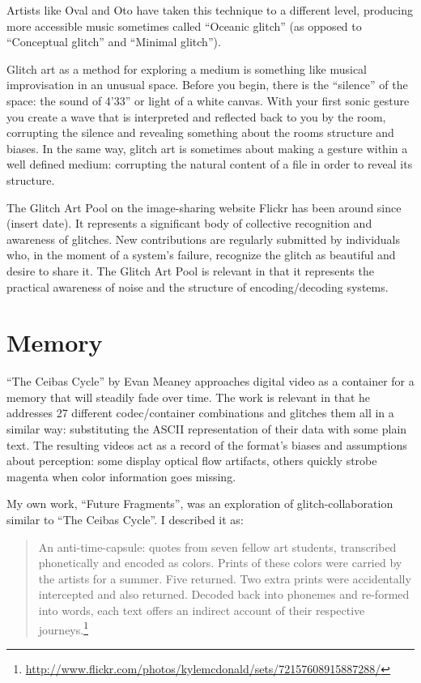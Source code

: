 \documentclass{thesis}
\begin{document}
	Artists like Oval and Oto have taken this technique to a different level, producing more accessible music sometimes called ``Oceanic glitch'' (as opposed to ``Conceptual glitch'' and ``Minimal glitch'').\cite{Sangild04}
	
	Glitch art as a method for exploring a medium is something like musical improvisation in an unusual space. Before you begin, there is the ``silence'' of the space: the sound of 4'33'' or light of a white canvas. With your first sonic gesture you create a wave that is interpreted and reflected back to you by the room, corrupting the silence and revealing something about the rooms structure and biases. In the same way, glitch art is sometimes about making a gesture within a well defined medium: corrupting the natural content of a file in order to reveal its structure.
	
	The Glitch Art Pool\cite{liminalmike_flickr:glitch_????} on the image-sharing website Flickr has been around since (insert date). It represents a significant body of collective recognition and awareness of glitches. New contributions are regularly submitted by individuals who, in the moment of a system's failure, recognize the glitch as beautiful and desire to share it. The Glitch Art Pool is relevant in that it represents the practical awareness of noise and the structure of encoding/decoding systems.
	
\section{Memory}	
	``The Ceibas Cycle'' by Evan Meaney\cite{evan_meaney_ceibas:_2008} approaches digital video as a container for a memory that will steadily fade over time. The work is relevant in that he addresses 27 different codec/container combinations and glitches them all in a similar way: substituting the ASCII representation of their data with some plain text. The resulting videos act as a record of the format's biases and assumptions about perception: some display optical flow artifacts, others quickly strobe magenta when color information goes missing.
	
	My own work, ``Future Fragments'', was an exploration of glitch-collaboration similar to ``The Ceibas Cycle''. I described it as:
	
	\begin{quote}
	An anti-time-capsule: quotes from seven fellow art students, transcribed phonetically and encoded as colors. Prints of these colors were carried by the artists for a summer. Five returned. Two extra prints were accidentally intercepted and also returned. Decoded back into phonemes and re-formed into words, each text offers an indirect account of their respective journeys.\footnote{\url{http://www.flickr.com/photos/kylemcdonald/sets/72157608915887288/}}
	\end{quote}
	
\end{document}
